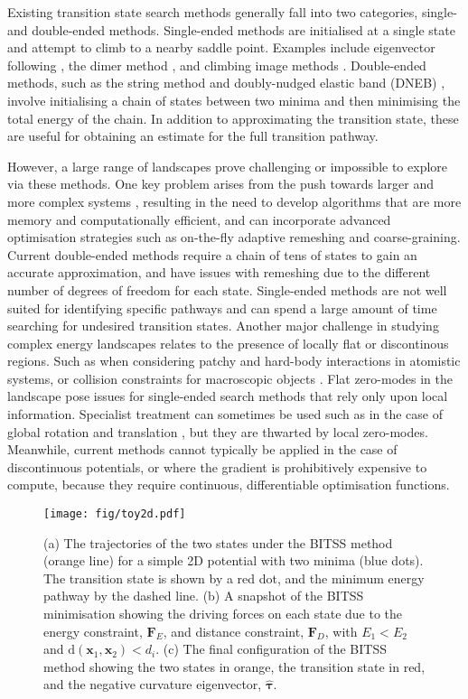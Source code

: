 \documentclass[aps,prl,twocolumn,10pt,groupedaddress]{revtex4-2}
\begin{document}
Existing transition state search methods generally fall into two categories, single- and double-ended methods.
Single-ended methods are initialised at a single state and attempt to climb to a nearby saddle point.
Examples include eigenvector following \cite{Cerjan1981}, the dimer method \cite{Heyden2005,Kastner2008}, and climbing image methods \cite{E2007,Ren2013}.
Double-ended methods, such as the string method \cite{E2002,E2007} and doubly-nudged elastic band (DNEB) \cite{Trygubenko2004}, involve initialising a chain of states between two minima and then minimising the total energy of the chain.
In addition to approximating the transition state, these are useful for obtaining an estimate for the full transition pathway.

However, a large range of landscapes prove challenging or impossible to explore via these methods.
One key problem arises from the push towards larger and more complex systems \cite{Trefethen2013,Shalf2020,Alexander2020}, resulting in the need to develop algorithms that are more memory and computationally efficient, and can incorporate advanced optimisation strategies such as on-the-fly adaptive remeshing and coarse-graining.
Current double-ended methods require a chain of tens of states to gain an accurate approximation, and have issues with remeshing due to the different number of degrees of freedom for each state.
Single-ended methods are not well suited for identifying specific pathways and can spend a large amount of time searching for undesired transition states.
Another major challenge in studying complex energy landscapes relates to the presence of locally flat or discontinous regions.
Such as when considering patchy \cite{McMullen2018,Nguemaha2018,Chen2018b} and hard-body \cite{Richard2018,Santra2018} interactions in atomistic systems, or collision constraints for macroscopic objects \cite{Wriggers2006}.
Flat zero-modes in the landscape pose issues for single-ended search methods that rely only upon local information.
Specialist treatment can sometimes be used such as in the case of global rotation and translation \cite{Page1988}, but they are thwarted by local zero-modes.
Meanwhile, current methods cannot typically be applied in the case of discontinuous potentials, or where the gradient is prohibitively expensive to compute, because they require continuous, differentiable optimisation functions.

\begin{figure}[htb]
  \texttt{[image: fig/toy2d.pdf]}
  \caption{\label{fig:toy2d}
    (a) The trajectories of the two states under the BITSS method (orange line) for a simple 2D potential with two minima (blue dots).
        The transition state is shown by a red dot, and the minimum energy pathway by the dashed line.
    (b) A snapshot of the BITSS minimisation showing the driving forces on each state due to the energy constraint, $\bm{F}_E$, and distance constraint, $\bm{F}_D$, with $E_1 < E_2$ and $\mathrm{d}(\bm{x}_1,\bm{x}_2) < d_i$.
    (c) The final configuration of the BITSS method showing the two states in orange, the transition state in red, and the negative curvature eigenvector, $\bm{\hat{\tau}}$.
  }
\end{figure}
\end{document}
